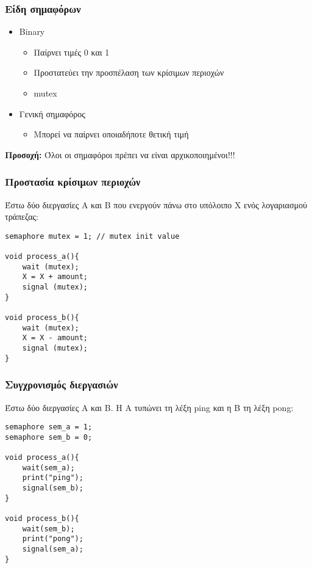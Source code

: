 \subsubsection{Είδη σημαφόρων}

\begin{itemize}
	\item	Βinary
		\begin{itemize}
			\item	Παίρνει τιμές 0 και 1
			\item	Προστατεύει την προσπέλαση των κρίσιμων περιοχών
			\item	mutex
		\end{itemize}
	\item	Γενική σημαφόρος
		\begin{itemize}
			\item	Μπορεί να παίρνει οποιαδήποτε θετική τιμή
		\end{itemize}
\end{itemize}

\textbf{Προσοχή:} Όλοι οι σημαφόροι πρέπει να είναι αρχικοποιημένοι!!!

\subsubsection{Προστασία κρίσιμων περιοχών}

Έστω δύο διεργασίες Α και Β που ενεργούν
πάνω στο υπόλοιπο Χ ενός λογαριασμού τράπεζας:

\begin{lstlisting}
semaphore mutex = 1; // mutex init value

void process_a(){
	wait (mutex);
	X = X + amount;
	signal (mutex);
}

void process_b(){
	wait (mutex);
	X = X - amount;
	signal (mutex);
}
\end{lstlisting}

\subsubsection{Συγχρονισμός διεργασιών}

Έστω δύο διεργασίες Α και Β. H A τυπώνει τη
λέξη ping και η Β τη λέξη pong:

\begin{lstlisting}
semaphore sem_a = 1;
semaphore sem_b = 0;

void process_a(){
	wait(sem_a);
	print("ping");
	signal(sem_b);
}

void process_b(){
	wait(sem_b);
	print("pong");
	signal(sem_a);
}
\end{lstlisting}

